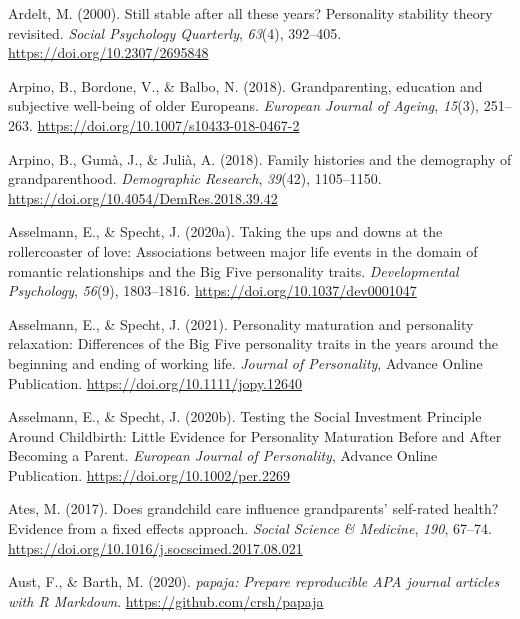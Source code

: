 \documentclass[
  english,
  man, noextraspace]{apa7}
\begin{document}
\leavevmode\hypertarget{ref-ardeltStillStableAll2000}{}%
Ardelt, M. (2000). Still stable after all these years? Personality stability theory revisited. \emph{Social Psychology Quarterly}, \emph{63}(4), 392--405. \url{https://doi.org/10.2307/2695848}

\leavevmode\hypertarget{ref-arpinoGrandparentingEducationSubjective2018}{}%
Arpino, B., Bordone, V., \& Balbo, N. (2018). Grandparenting, education and subjective well-being of older Europeans. \emph{European Journal of Ageing}, \emph{15}(3), 251--263. \url{https://doi.org/10.1007/s10433-018-0467-2}

\leavevmode\hypertarget{ref-arpinoFamilyHistoriesDemography2018}{}%
Arpino, B., Gumà, J., \& Julià, A. (2018). Family histories and the demography of grandparenthood. \emph{Demographic Research}, \emph{39}(42), 1105--1150. \url{https://doi.org/10.4054/DemRes.2018.39.42}

\leavevmode\hypertarget{ref-asselmannTakingUpsDowns2020}{}%
Asselmann, E., \& Specht, J. (2020a). Taking the ups and downs at the rollercoaster of love: Associations between major life events in the domain of romantic relationships and the Big Five personality traits. \emph{Developmental Psychology}, \emph{56}(9), 1803--1816. \url{https://doi.org/10.1037/dev0001047}

\leavevmode\hypertarget{ref-asselmannPersonalityMaturationPersonality2021}{}%
Asselmann, E., \& Specht, J. (2021). Personality maturation and personality relaxation: Differences of the Big Five personality traits in the years around the beginning and ending of working life. \emph{Journal of Personality}, Advance Online Publication. \url{https://doi.org/10.1111/jopy.12640}

\leavevmode\hypertarget{ref-asselmannTestingSocialInvestment2020}{}%
Asselmann, E., \& Specht, J. (2020b). Testing the Social Investment Principle Around Childbirth: Little Evidence for Personality Maturation Before and After Becoming a Parent. \emph{European Journal of Personality}, Advance Online Publication. \url{https://doi.org/10.1002/per.2269}

\leavevmode\hypertarget{ref-atesDoesGrandchildCare2017}{}%
Ates, M. (2017). Does grandchild care influence grandparents' self-rated health? Evidence from a fixed effects approach. \emph{Social Science \& Medicine}, \emph{190}, 67--74. \url{https://doi.org/10.1016/j.socscimed.2017.08.021}

\leavevmode\hypertarget{ref-R-papaja}{}%
Aust, F., \& Barth, M. (2020). \emph{papaja: Prepare reproducible APA journal articles with R Markdown}. \url{https://github.com/crsh/papaja}
\end{document}
